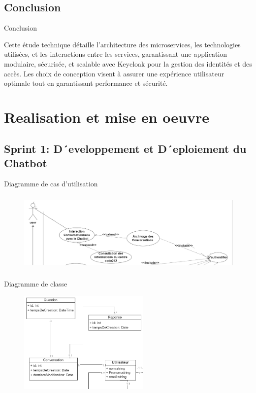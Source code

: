 \documentclass[aspectratio=169]{beamer}
\begin{document}
\subsection{Conclusion}
\begin{frame}{Conclusion}

    Cette étude technique détaille l'architecture des microservices, les technologies utilisées, et les interactions entre les services, garantissant une application modulaire, sécurisée, et scalable avec Keycloak pour la gestion des identités et des accès. Les choix de conception visent à assurer une expérience utilisateur optimale tout en garantissant performance et sécurité.
\end{frame}


\section{Realisation et mise en oeuvre}
\subsection{Sprint 1: D´eveloppement et D´eploiement du Chatbot}
\begin{frame}{Diagramme de cas d'utilisation}

    \begin{figure}[htpb]
        \centering
        \includegraphics[height=4cm]{assets/images/sprint1-usecase.png}
    \end{figure}
\end{frame}

\begin{frame}{Diagramme de classe}

    \begin{figure}[htpb]
        \centering
        \includegraphics[height=5cm]{assets/images/sprint1-class.png}
    \end{figure}
\end{frame}
\end{document}
